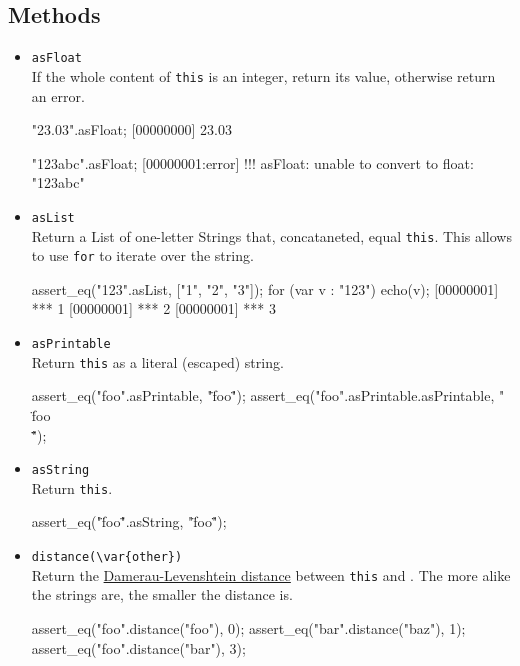 \subsection{Methods}
\begin{itemize}
\item \lstinline|asFloat|\\
  If the whole content of \lstinline|this| is an integer, return its
  value, otherwise return an error.
\begin{urbiscript}[firstnumber=last]
"23.03".asFloat;
[00000000] 23.03

"123abc".asFloat;
[00000001:error] !!! asFloat: unable to convert to float: "123abc"
\end{urbiscript}

\item \lstinline|asList|\\
  Return a List of one-letter Strings that, concataneted, equal
  \lstinline|this|.  This allows to use \lstinline|for| to iterate
  over the string.
\begin{urbiscript}[firstnumber=last]
assert_eq("123".asList, ["1", "2", "3"]);
for (var v : "123")
  echo(v);
[00000001] *** 1
[00000001] *** 2
[00000001] *** 3
\end{urbiscript}

\item \lstinline|asPrintable|\\
  Return \lstinline|this| as a literal (escaped) string.
\begin{urbiscript}[firstnumber=last]
assert_eq("foo".asPrintable, "\"foo\"");
assert_eq("foo".asPrintable.asPrintable, "\"\\\"foo\\\"\"");
\end{urbiscript}

\item \lstinline|asString|\\
  Return \lstinline|this|.
\begin{urbiscript}[firstnumber=last]
assert_eq("\"foo\"".asString, "\"foo\"");
\end{urbiscript}

\item \lstinline|distance(\var{other})|\\
  Return the
  \href{http://en.wikipedia.org/wiki/Damerau-Levenshtein_distance}
  {Damerau-Levenshtein distance} between \lstinline|this| and
  .  The more alike the strings are, the smaller the
  distance is.
\begin{urbiscript}[firstnumber=last]
assert_eq("foo".distance("foo"), 0);
assert_eq("bar".distance("baz"), 1);
assert_eq("foo".distance("bar"), 3);
\end{urbiscript}


\end{itemize}
